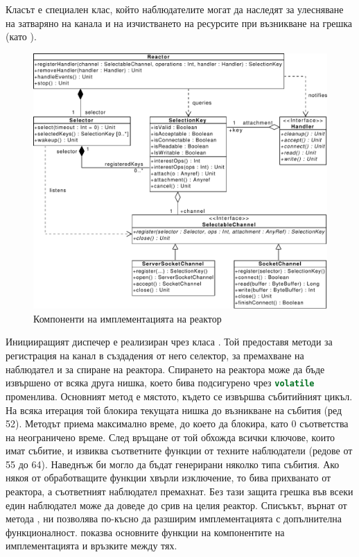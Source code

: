 Класът  е специален клас, който наблюдателите могат да наследят за улесняване на затваряно на канала и на изчистването на ресурсите при възникване на грешка (като ).

\begin{figure}[h]
  \centering\includegraphics[width=\textwidth]{images/reactor-implementation.pdf}
  \caption{Компоненти на имплементацията на реактор}
  \label{fig:reactor-implementation-components}
\end{figure}

Иницииращият диспечер е реализиран чрез класа . Той предоставя методи за регистрация на канал в създадения от него селектор, за премахване на наблюдател и за спиране на реактора. Спирането на реактора може да бъде извършено от всяка друга нишка, което бива подсигурено чрез \lstinline[language=Java]{volatile} променлива. Основният метод  е мястото, където се извършва събитийният цикъл. На всяка итерация той блокира текущата нишка до възникване на събития (ред 52). Методът  приема максимално време, до което да блокира, като 0 съответства на неограничено време. След връщане от  той обхожда всички ключове, които имат събитие, и извиква съответните функции от техните наблюдатели (редове от 55 до 64). Наведнъж би могло да бъдат генерирани няколко типа събития. Ако някоя от обработващите функции хвърли изключение, то бива прихванато от реактора, а съответният наблюдател премахнат. Без тази защита грешка във всеки един наблюдател може да доведе до срив на целия реактор. Списъкът, върнат от метода , ни позволява по-късно да разширим имплементацията с допълнителна функционалност.  показва основните функции на компонентите на имплементацията и връзките между тях.

